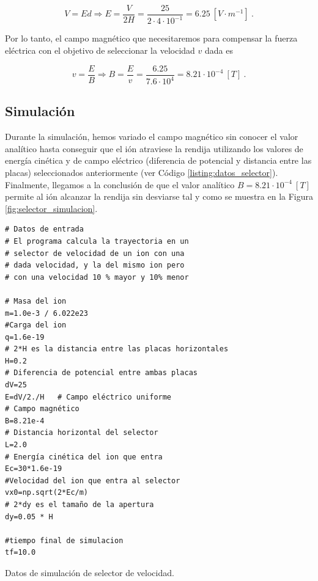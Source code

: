 \documentclass[journal]{IEEEtran}
\newenvironment{code}{\captionsetup{type=listing}}{\par\addvspace{\baselineskip}}
\begin{document}
\begin{equation}
    V = Ed \Rightarrow E = \displaystyle\frac{V}{2H} = \displaystyle\frac{25}{2\cdot 4\cdot 10^{-1}} = 6.25~[V\cdot m^{-1}]~.
\end{equation}

Por lo tanto, el campo magnético que necesitaremos para compensar la fuerza eléctrica con el objetivo de seleccionar la velocidad $v$ dada es

\begin{equation}
    v = \displaystyle\frac{E}{B} \Rightarrow B = \displaystyle\frac{E}{v} = \displaystyle\frac{6.25}{7.6\cdot 10^4} = 8.21 \cdot 10^{-4}~[T]~.
\end{equation}

\subsection{Simulación}

Durante la simulación, hemos variado el campo magnético sin conocer el valor analítico hasta conseguir que el ión atraviese la rendija utilizando los valores de energía cinética y de campo eléctrico (diferencia de potencial y distancia entre las placas) seleccionados anteriormente (ver Código \ref{listing:datos_selector}). Finalmente, llegamos a la conclusión de que el valor analítico $B = 8.21\cdot 10^{-4}~[T]$ permite al ión alcanzar la rendija sin desviarse tal y como se muestra en la Figura \ref{fig:selector_simulacion}.

\newpage

\begin{code}
    \begin{verbatim}
# Datos de entrada
# El programa calcula la trayectoria en un
# selector de velocidad de un ion con una
# dada velocidad, y la del mismo ion pero
# con una velocidad 10 % mayor y 10% menor

# Masa del ion
m=1.0e-3 / 6.022e23  
#Carga del ion
q=1.6e-19   
# 2*H es la distancia entre las placas horizontales
H=0.2
# Diferencia de potencial entre ambas placas  
dV=25     
E=dV/2./H   # Campo eléctrico uniforme
# Campo magnético
B=8.21e-4  
# Distancia horizontal del selector
L=2.0  
# Energía cinética del ion que entra
Ec=30*1.6e-19  
#Velocidad del ion que entra al selector
vx0=np.sqrt(2*Ec/m)  
# 2*dy es el tamaño de la apertura
dy=0.05 * H 

#tiempo final de simulacion
tf=10.0           
    \end{verbatim}
    \caption{Datos de simulación de selector de velocidad.}
    \label{listing:datos_selector}
\end{code}
\end{document}
